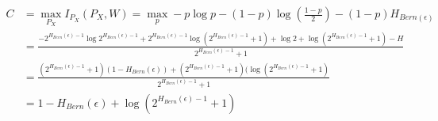 \documentclass[
  course = {{EE623 Information Theory}},
  quartile = {{4}},
  assignment = 6,
  name = {{Mohammad Mahdi Rahimi}},
  studentnumber = {{20208244}},
  email = {{mahi@kaist.ac.kr}},
  firstexercise = 1
]{aga-homework}
\begin{document}
\begin{equation} \label{eq3}
\begin{split}
C & = \max_{P_X}I_{P_X}(P_X, W) = \max_{p} -p\log p - (1 - p)\log(\frac{1-p}{2}) -(1-p)H_{Bern(\epsilon)}\\
& =  \frac{-2^{H_{Bern}(\epsilon) - 1}\log{2^{H_{Bern}(\epsilon) - 1}} + 2^{H_{Bern}(\epsilon) - 1} \log{(2^{H_{Bern}(\epsilon) - 1} + 1)} + \log2 + \log{(2^{H_{Bern}(\epsilon) - 1} + 1)} - H }{2^{H_{Bern}(\epsilon) - 1} + 1}\\
& = \frac{(2^{H_{Bern}(\epsilon) - 1} + 1)(1 - H_{Bern}(\epsilon)) + (2^{H_{Bern}(\epsilon) - 1} + 1)(\log{(2^{H_{Bern}(\epsilon) - 1} + 1)}}{2^{H_{Bern}(\epsilon) - 1} + 1}\\
& = 1 - H_{Bern}(\epsilon) + \log{(2^{H_{Bern}(\epsilon) - 1} + 1)}\\
\end{split}
\end{equation}
\end{document}
